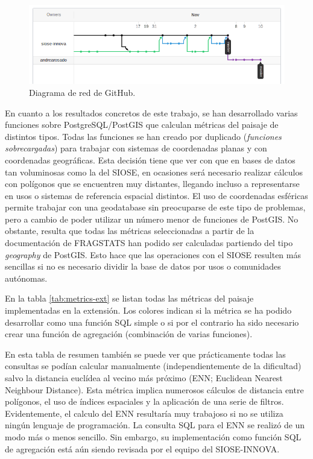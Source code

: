 \begin{figure}
\begin{center}
\includegraphics[width=\textwidth]{ResultadosyDiscusion/Figs/network.png}
\caption{Diagrama de red de GitHub.  \label{fig:network}}
\end{center}
\end{figure}

En cuanto a los resultados concretos de este trabajo, se han desarrollado varias funciones sobre PostgreSQL/PostGIS que calculan métricas del paisaje de distintos tipos. Todas las funciones se han creado por duplicado (\textit{funciones sobrecargadas}) para trabajar con sistemas de coordenadas planas y con coordenadas geográficas. Esta decisión tiene que ver con que en bases de datos tan voluminosas como la del SIOSE, en ocasiones será necesario realizar cálculos con polígonos que se encuentren muy distantes, llegando incluso a representarse en usos o sistemas de referencia espacial distintos. El uso de coordenadas esféricas permite trabajar con una geodatabase sin preocuparse de este tipo de problemas, pero a cambio de poder utilizar un número menor de funciones de PostGIS. No obstante, resulta que todas las métricas seleccionadas a partir de la documentación de FRAGSTATS han podido ser calculadas partiendo del tipo \textit{geography} de PostGIS. Esto hace que las operaciones con el SIOSE resulten más sencillas si no es necesario dividir la base de datos por usos o comunidades autónomas.

En la tabla \ref{tab:metrics-ext} se listan todas las métricas del paisaje implementadas en la extensión. Los colores indican si la métrica se ha podido desarrollar como una función SQL simple o si por el contrario ha sido necesario crear una función de agregación (combinación de varias funciones). 

En esta tabla de resumen también se puede ver que prácticamente todas las consultas se podían calcular manualmente (independientemente de la dificultad) salvo la distancia euclídea al vecino más próximo (ENN; Euclidean Nearest Neighbour Distance). Esta métrica implica numerosos cálculos de distancia entre polígonos, el uso de índices espaciales y la aplicación de una serie de filtros. Evidentemente, el calculo del ENN resultaría muy trabajoso si no se utiliza ningún lenguaje de programación. La consulta SQL para el ENN se realizó de un modo más o menos sencillo. Sin embargo, su implementación como función SQL de agregación está aún siendo revisada por el equipo del SIOSE-INNOVA.

